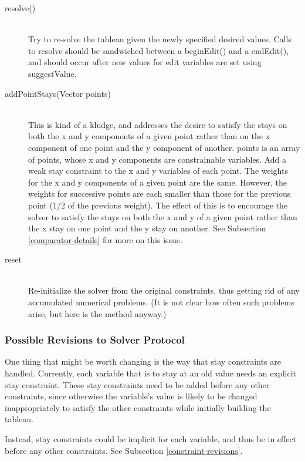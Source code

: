 \documentclass{article}
\begin{document}
\begin{description}
\item[{\sf resolve()}] \ \\
Try to re-solve the tableau given the newly specified desired values.
Calls to resolve should be sandwiched between a {\sf beginEdit()} and a
{\sf endEdit()}, and should occur after new values for edit variables
are set using {\sf suggestValue}.

\item[{\sf addPointStays(Vector points)}] \ \\
This is kind of a kludge, and addresses the desire to satisfy the stays
on both the {\sf x} and {\sf y} components of a given point rather than
on the {\sf x} component of one point and the {\sf y} component of another.
{\sf points} is an array of points, whose {\sf x} and {\sf y} components
are constrainable variables.  Add a weak stay constraint to the {\sf x}
and {\sf y} variables of each point.  The weights for the {\sf x} and
{\sf y} components of a given point are the same.  However, the weights
for successive points are each smaller than those for the previous
point (1/2 of the previous weight).  The effect of this is to encourage the
solver to satisfy the stays on both the {\sf x} and {\sf y} of a given
point rather than the {\sf x} stay on one point and the {\sf y} stay on
another.  See Subsection \ref{comparator-details} for more on this issue.

\item[{\sf reset}] \ \\
Re-initialize the solver from the original constraints,
thus getting rid of any accumulated numerical problems.  (It is not clear
how often such problems arise, but here is the method anyway.)

\end{description}

\subsubsection{Possible Revisions to Solver Protocol}

One thing that might be worth changing is the way that stay constraints
are handled.  Currently, each variable that is to stay at an old value
needs an explicit stay constraint.  These stay constraints need to be
added before any other constraints, since otherwise the variable's value
is likely to be changed inappropriately to satisfy the other
constraints while initially building the tableau.

Instead, stay constraints could be implicit for each variable, and thus
be in effect before any other constraints.  See Subsection
\ref{constraint-revisions}.
\end{document}
